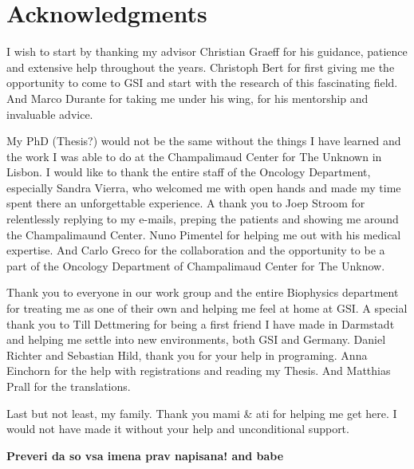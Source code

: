 

\chapter*{Acknowledgments}
I wish to start by thanking my advisor Christian Graeff for his guidance, patience and extensive help throughout the years. Christoph Bert for first giving me the opportunity to come to GSI and start with the research of this fascinating field. And Marco Durante for taking me under his wing, for his mentorship and invaluable advice.  

My PhD (Thesis?) would not be the same without the things I have learned and the work I was able to do at the Champalimaud Center for The Unknown in Lisbon. I would like to thank the entire staff of the Oncology Department, especially Sandra Vierra, who welcomed me with open hands and made my time spent there an unforgettable experience. A thank you to Joep Stroom for relentlessly replying to my e-mails, preping the patients and showing me around the Champalimaund Center. Nuno Pimentel for helping me out with his medical expertise. And Carlo Greco for the collaboration and the opportunity to be a part of the  Oncology Department of Champalimaud Center for The Unknow.

Thank you to everyone in our work group and the entire Biophysics department for treating me as one of their own and helping me feel at home at GSI. A special thank you to Till Dettmering for being a first friend I have made in Darmstadt and helping me settle into new environments, both GSI and Germany.  Daniel Richter and Sebastian Hild, thank you for your help in programing. Anna Einchorn for the help with registrations and reading my Thesis. And Matthias Prall for the translations. 

Last but not least, my family. Thank you mami & ati for helping me get here. I would not have made it without your help and unconditional support. 

\textbf{Preveri da so vsa imena prav napisana! and babe}

